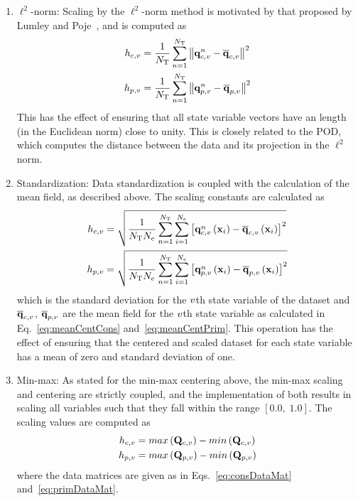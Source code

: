 \begin{enumerate}
	\item $\ell^2$-norm: Scaling by the $\ell^2$-norm method is motivated by that proposed by Lumley and Poje~\cite{Lumley1997}, and is computed as
	\begin{align}
		h_{c,v} &= \frac{1}{N_{\text{T}}} \sum_{n=1}^{N_{\text{T}}} \left\Vert \mathbf{q}_{c,v}^{n} - \mathbf{\overline{q}}_{c,v} \right\Vert^2 \\
		h_{p,v} &= \frac{1}{N_{\text{T}}} \sum_{n=1}^{N_{\text{T}}} \left\Vert \mathbf{q}_{p,v}^{n} - \mathbf{\overline{q}}_{p,v} \right\Vert^2
	\end{align}
	This has the effect of ensuring that all state variable vectors have an length (in the Euclidean norm) close to unity. This is closely related to the POD, which computes the distance between the data and its projection in the $\ell^2$ norm.

	\item Standardization: Data standardization is coupled with the calculation of the mean field, as described above. The scaling constants are calculated as
	\begin{align}
		h_{c,v} &= \sqrt{\frac{1}{N_{\text{T}} N_{e}} \sum_{n=1}^{N_{\text{T}}} \sum_{i = 1}^{N_{e}} \left[\mathbf{q}_{c,v}^{n}\left(\mathbf{x}_{i}\right) - \mathbf{\overline{q}}_{c,v}\left(\mathbf{x}_{i}\right) \right]^2} \\
		h_{p,v} &= \sqrt{\frac{1}{N_{\text{T}} N_{e}} \sum_{n=1}^{N_{\text{T}}} \sum_{i = 1}^{N_{e}} \left[\mathbf{q}_{p,v}^{n}\left(\mathbf{x}_{i}\right) - \mathbf{\overline{q}}_{p,v}\left(\mathbf{x}_{i}\right) \right]^2}
	\end{align}
	which is the standard deviation for the $v$th state variable of the dataset and $\mathbf{\overline{q}}_{c,v}$, $\mathbf{\overline{q}}_{p,v}$ are the mean field for the $v$th state variable as calculated in Eq.~\ref{eq:meanCentCons} and~\ref{eq:meanCentPrim}. This operation has the effect of ensuring that the centered and scaled dataset for each state variable has a mean of zero and standard deviation of one.

	\item Min-max: As stated for the min-max centering above, the min-max scaling and centering are strictly coupled, and the implementation of both results in scaling all variables such that they fall within the range $[0.0, \; 1.0]$. The scaling values are computed as
	\begin{align}
		\consScaleVar{\varIdx} &= max\left(\consDataMatVar\right) - min\left(\consDataMatVar\right) \\
		\primScaleVar{\varIdx} &= max\left(\primDataMatVar\right) - min\left(\primDataMatVar\right)
	\end{align}
	where the data matrices are given as in Eqs.~\ref{eq:consDataMat} and~\ref{eq:primDataMat}.


\end{enumerate}
